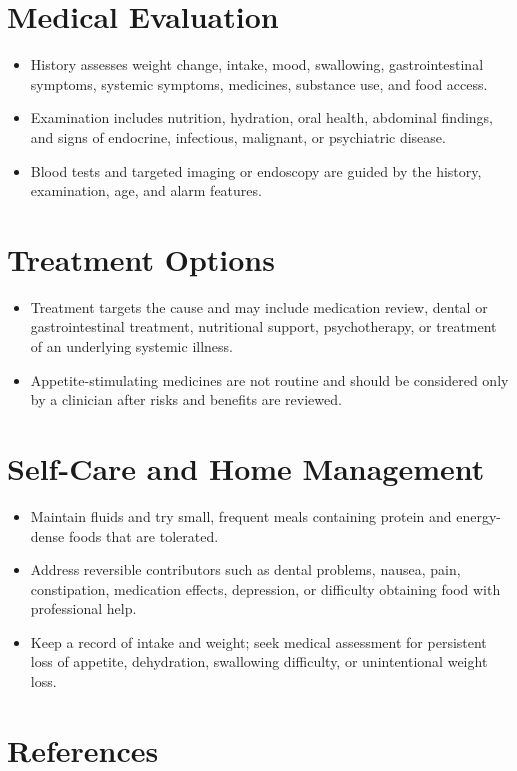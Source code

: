 \section*{Medical Evaluation}
\begin{itemize}
  \item History assesses weight change, intake, mood, swallowing, gastrointestinal symptoms, systemic symptoms, medicines, substance use, and food access.
  \item Examination includes nutrition, hydration, oral health, abdominal findings, and signs of endocrine, infectious, malignant, or psychiatric disease.
  \item Blood tests and targeted imaging or endoscopy are guided by the history, examination, age, and alarm features.
\end{itemize}

\section*{Treatment Options}
\begin{itemize}
  \item Treatment targets the cause and may include medication review, dental or gastrointestinal treatment, nutritional support, psychotherapy, or treatment of an underlying systemic illness.
  \item Appetite-stimulating medicines are not routine and should be considered only by a clinician after risks and benefits are reviewed.
\end{itemize}

\section*{Self-Care and Home Management}
\begin{itemize}
  \item Maintain fluids and try small, frequent meals containing protein and energy-dense foods that are tolerated.
  \item Address reversible contributors such as dental problems, nausea, pain, constipation, medication effects, depression, or difficulty obtaining food with professional help.
  \item Keep a record of intake and weight; seek medical assessment for persistent loss of appetite, dehydration, swallowing difficulty, or unintentional weight loss.
\end{itemize}

\section*{References}


